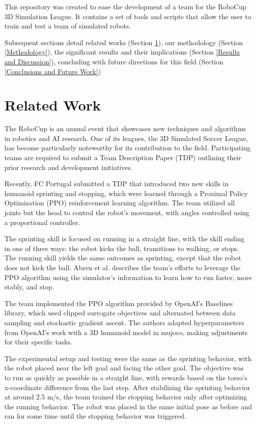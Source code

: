 \documentclass[conference]{IEEEtran}
\begin{document}
This repository was created to ease the development of a team for the RoboCup 3D Simulation League.
It contains a set of tools and scripts that allow the user to train and test a team of simulated robots.

Subsequent sections detail related works (Section \ref{Related Work}), our methodology (Section \ref{Methodology}),
the significant results and their implications (Section \ref{Results and Discussion}),
concluding with future directions for this field (Section \ref{Conclusions and Future Work})

\section{Related Work}\label{Related Work}

The RoboCup is an annual event that showcases new techniques and algorithms in robotics and AI research. One of its leagues, the 3D Simulated Soccer League, has become particularly noteworthy for its contribution to the field. Participating teams are required to submit a Team Description Paper (TDP) outlining their prior research and development initiatives.

Recently, FC Portugal submitted a TDP \cite{lau2020fc} that introduced two new skills in humanoid sprinting and stopping, which were learned through a Proximal Policy Optimization (PPO) reinforcement learning algorithm. The team utilized all joints but the head to control the robot's movement, with angles controlled using a proportional controller.

The sprinting skill is focused on running in a straight line, with the skill ending in one of three ways: the robot kicks the ball, transitions to walking, or stops. The running skill yields the same outcomes as sprinting, except that the robot does not kick the ball. Abreu et al. \cite{10.1007/978-3-030-35699-6_1} describes the team's efforts to leverage the PPO algorithm using the simulator's information to learn how to run faster, more stably, and stop.

The team implemented the PPO algorithm provided by OpenAI's Baselines library, which used clipped surrogate objectives and alternated between data sampling and stochastic gradient ascent. The authors adapted hyperparameters from OpenAI's work with a 3D humanoid model in mujoco, making adjustments for their specific tasks.

The experimental setup and testing were the same as the sprinting behavior, with the robot placed near the left goal and facing the other goal. The objective was to run as quickly as possible in a straight line, with rewards based on the torso's x-coordinate difference from the last step. After stabilizing the sprinting behavior at around 2.5 m/s, the team trained the stopping behavior only after optimizing the running behavior. The robot was placed in the same initial pose as before and ran for some time until the stopping behavior was triggered.
\end{document}
